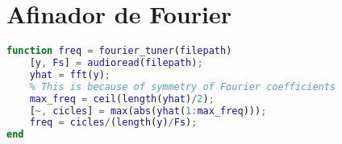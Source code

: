 \documentclass{article}
\begin{document}
    \newpage

    \appendix

        \section{Afinador de Fourier}
            \label{appendix:tuner}

            \begin{lstlisting}[language=Matlab]
function freq = fourier_tuner(filepath)
    [y, Fs] = audioread(filepath);
    yhat = fft(y);
    % This is because of symmetry of Fourier coefficients
    max_freq = ceil(length(yhat)/2);
    [~, cicles] = max(abs(yhat(1:max_freq)));
    freq = cicles/(length(y)/Fs);
end
            \end{lstlisting}
\end{document}
